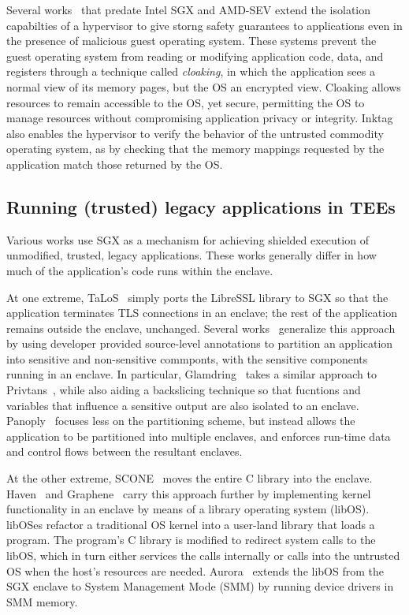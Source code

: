 %
Several works~\cite{overshadow,inktag} that predate Intel SGX and AMD-SEV
extend the isolation capabilties of a hypervisor to give storng safety
guarantees to applications even in the presence of malicious guest operating
system.
%
These systems prevent the guest operating system from reading or modifying
application code, data, and registers through a technique called
\emph{cloaking}, in which the application sees a normal view of its memory
pages, but the OS an encrypted view.
%
Cloaking allows resources to remain accessible to the OS, yet secure,
permitting the OS to manage resources without compromising application
privacy or integrity.
%
Inktag also enables the hypervisor to verify the behavior of the untrusted
commodity operating system, as by checking that the memory mappings requested
by the application match those returned by the OS.


\subsection{Running (trusted) legacy applications in TEEs}
%
Various works use SGX as a mechanism for achieving shielded execution of
unmodified, trusted, legacy applications.
%
These works generally differ in how much of the application's code runs
within the enclave.


%
At one extreme, TaLoS~\cite{talos} simply ports the LibreSSL library to SGX so
that the application terminates TLS connections in an enclave; the rest of
the application remains outside the enclave, unchanged.
%
Several works~\cite{glamdring, panoply} generalize this approach by using developer
provided source-level annotations to partition an application into sensitive and
non-sensitive commponts, with the sensitive components running in an enclave.
%
In particular, Glamdring~\cite{glamdring} takes a similar approach to
Privtans~\cite{privtrans}, while also aiding a backslicing technique so that
fucntions and variables that influence a sensitive output are also isolated to
an enclave.  
%
Panoply~\cite{panoply} focuses less on the  partitioning scheme, but instead
allows the application to be partitioned into multiple enclaves, and
enforces run-time data and control flows between the resultant enclaves.


%
At the other extreme, SCONE~\cite{scone} moves the entire C library into the enclave.
%
Haven~\cite{haven} and Graphene~\cite{graphene} carry this approach further by
implementing kernel functionality in an enclave by means of a library operating
system (libOS).  libOSes refactor a traditional OS kernel into a user-land
library that loads a program.
%
The program's C library is modified to redirect system calls to the libOS, which
in turn either services the calls internally or calls into the untrusted OS
when the host's resources are needed.
%
Aurora~\cite{liang2018aurora} extends the libOS from the SGX enclave to System
Management Mode (SMM) by running device drivers in SMM memory.


